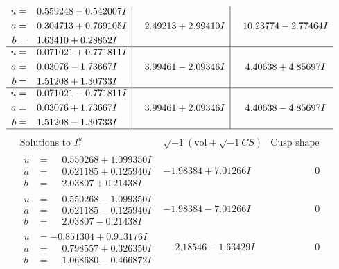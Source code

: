 \documentclass[1p]{elsarticle_modified}
\theoremstyle{definition}
\newcommand{\I}{\sqrt{-1}}
\begin{document}
$$\begin{array}{c|c|c}
\begin{aligned}
u &= \phantom{-}0.559248 - 0.542007 I \\
a &= \phantom{-}0.304713 + 0.769105 I \\
b &= \phantom{-}1.63410 + 0.28852 I\end{aligned}
 & \phantom{-}2.49213 + 2.99410 I & \phantom{-}10.23774 - 2.77464 I \\ \hline\begin{aligned}
u &= \phantom{-}0.071021 + 0.771811 I \\
a &= \phantom{-}0.03076 - 1.73667 I \\
b &= \phantom{-}1.51208 + 1.30733 I\end{aligned}
 & \phantom{-}3.99461 - 2.09346 I & \phantom{-}4.40638 + 4.85697 I \\ \hline\begin{aligned}
u &= \phantom{-}0.071021 - 0.771811 I \\
a &= \phantom{-}0.03076 + 1.73667 I \\
b &= \phantom{-}1.51208 - 1.30733 I\end{aligned}
 & \phantom{-}3.99461 + 2.09346 I & \phantom{-}4.40638 - 4.85697 I\\
 \hline 
 \end{array}$$\newpage$$\begin{array}{c|c|c}  
\text{Solutions to }I^u_{1}& \I (\text{vol} + \sqrt{-1}CS) & \text{Cusp shape}\\
 \hline 
\begin{aligned}
u &= \phantom{-}0.550268 + 1.099350 I \\
a &= \phantom{-}0.621185 + 0.125940 I \\
b &= \phantom{-}2.03807 + 0.21438 I\end{aligned}
 & -1.98384 + 7.01266 I & \phantom{-0.000000 } 0 \\ \hline\begin{aligned}
u &= \phantom{-}0.550268 - 1.099350 I \\
a &= \phantom{-}0.621185 - 0.125940 I \\
b &= \phantom{-}2.03807 - 0.21438 I\end{aligned}
 & -1.98384 - 7.01266 I & \phantom{-0.000000 } 0 \\ \hline\begin{aligned}
u &= -0.851304 + 0.913176 I \\
a &= \phantom{-}0.798557 + 0.326350 I \\
b &= \phantom{-}1.068680 - 0.466872 I\end{aligned}
 & \phantom{-}2.18546 - 1.63429 I & \phantom{-0.000000 } 0 \\ \hline\begin{aligned}

\end{aligned}
\end{array}$$
\end{document}
